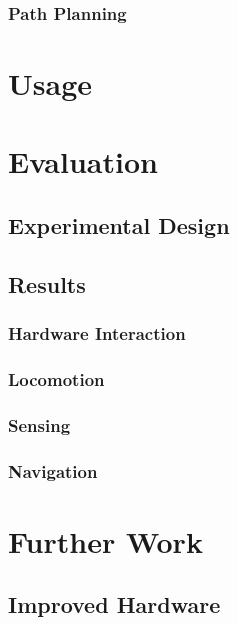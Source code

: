 \documentclass{l4proj}
\begin{document}
\subsection{Path Planning}


\chapter{Usage}


\chapter{Evaluation}

\section{Experimental Design}

\section{Results}
\subsection{Hardware Interaction}
\subsection{Locomotion}
\subsection{Sensing}
\subsection{Navigation}


\chapter{Further Work}


\section{Improved Hardware}
\end{document}
